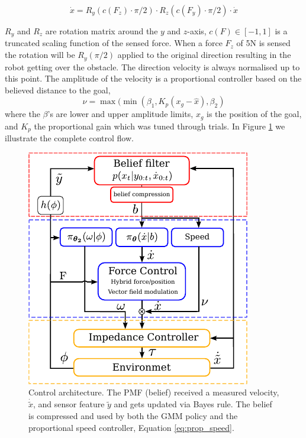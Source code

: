 \begin{equation}
  \dot{x} = R_y(c(F_z) \cdot \pi/2) \cdot R_z(c(F_y) \cdot \pi/2) \cdot \dot{x} \label{eq:modulation}
\end{equation}

$R_y$ and $R_z$ are rotation matrix around the $y$ and $z$-axis, $c(F) \in [-1,1]$ is a truncated scaling function of the sensed 
force.  When a force $F_z$ of 5N is sensed the rotation will be $R_y(\pi/2)$ applied to the original direction resulting in the robot
getting over the obstacle. The direction velocity is always normalised up to this point. The amplitude of the velocity is a proportional
controller based on the believed distance to the goal,
\begin{equation}
  \nu = \max(\min(\beta_1,K_p (x_g - \hat{x}),\beta_2)\label{eq:prop_speed}
\end{equation}
where the $\beta$'s are lower and upper amplitude limits, $x_g$ is the position of the
goal, and $K_p$ the proportional gain which was tuned through trials. In Figure \ref{fig:control_flow}
we illustrate the complete control flow.

\begin{figure}
  \centering
  \includegraphics[width=\textwidth]{./ch4-PiH/Figures/control_flow_final.pdf}
  \caption{Control architecture. The PMF (belief) received a measured velocity, $\dot{\tilde{x}}$, and sensor feature $\tilde{y}$ and gets updated 
  via Bayes rule. The belief is compressed and used by both the GMM policy and the proportional speed controller, Equation \ref{eq:prop_speed}.}
  \label{fig:control_flow}
\end{figure}

